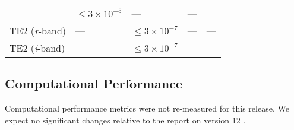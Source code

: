 \documentclass[DM,toc]{lsstdoc}
\begin{document}
\begin{longtable}[]{@{}lllll@{}}
\begin{minipage}[t]{0.05\columnwidth}
\end{minipage} & \begin{minipage}[t]{0.24\columnwidth}\raggedright\strut
\(\leq 3\times 10^{-5}\)\strut
\end{minipage} & \begin{minipage}[t]{0.21\columnwidth}\raggedright\strut
---\strut
\end{minipage} & \begin{minipage}[t]{0.22\columnwidth}\raggedright\strut
---\strut
\end{minipage}\tabularnewline
\begin{minipage}[t]{0.13\columnwidth}\raggedright\strut
TE2 (\emph{r}-band)\strut
\end{minipage} & \begin{minipage}[t]{0.05\columnwidth}\raggedright\strut
---\strut
\end{minipage} & \begin{minipage}[t]{0.24\columnwidth}\raggedright\strut
\(\leq 3\times 10^{-7}\)\strut
\end{minipage} & \begin{minipage}[t]{0.21\columnwidth}\raggedright\strut
---\strut
\end{minipage} & \begin{minipage}[t]{0.22\columnwidth}\raggedright\strut
---\strut
\end{minipage}\tabularnewline
\begin{minipage}[t]{0.13\columnwidth}\raggedright\strut
TE2 (\emph{i}-band)\strut
\end{minipage} & \begin{minipage}[t]{0.05\columnwidth}\raggedright\strut
---\strut
\end{minipage} & \begin{minipage}[t]{0.24\columnwidth}\raggedright\strut
\(\leq 3\times 10^{-7}\)\strut
\end{minipage} & \begin{minipage}[t]{0.21\columnwidth}\raggedright\strut
---\strut
\end{minipage} & \begin{minipage}[t]{0.22\columnwidth}\raggedright\strut
---\strut
\end{minipage}\tabularnewline
\bottomrule
\end{longtable}

\subsection{Computational Performance}\label{computational-performance}

Computational performance metrics were not re-measured for this release.
We expect no significant changes relative to the
report on version 12 .



\end{document}

